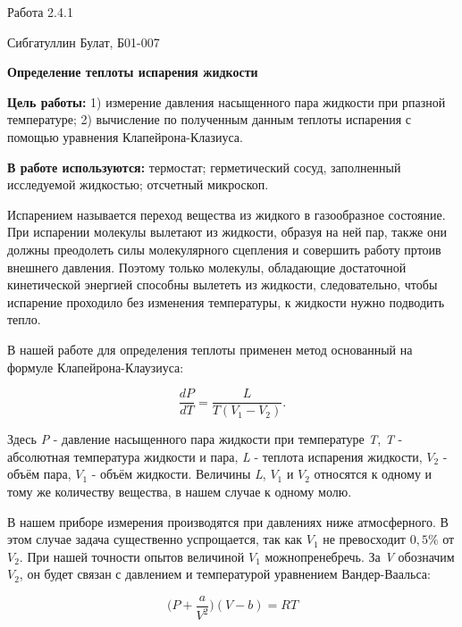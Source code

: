 \documentclass[12pt,a4paper]{article}
\begin{document}
\begin{center}
    \large
    Работа 2.4.1
    
    Сибгатуллин Булат, Б01-007
    
    \vspace{0.5cm}
    \textbf{Определение теплоты испарения жидкости}

\end{center}

\vspace{0.5cm}
\textbf{Цель работы:} 1) измерение давления насыщенного пара жидкости при рпазной температуре; 2) вычисление по полученным данным теплоты испарения с помощью уравнения Клапейрона-Клазиуса.

\vspace{0.5cm}
\textbf{В работе используются:} термостат; герметический сосуд, заполненный исследуемой жидкостью; отсчетный микроскоп.

\vspace{0.5cm}
Испарением называется переход вещества из жидкого в газообразное состояние. При испарении молекулы вылетают из жидкости, образуя на ней пар, также они должны преодолеть силы молекулярного сцепления и совершить работу пртоив внешнего давления. Поэтому  только молекулы, обладающие достаточной кинетической энергией способны вылететь из жидкости, следовательно, чтобы испарение проходило без изменения температуры, к жидкости нужно подводить тепло. 

В нашей работе для определения теплоты применен метод основанный на формуле Клапейрона-Клаузиуса:

\begin{equation}\label{Klapeiron-Klausius}
\frac{dP}{dT} = \frac{L}{T (V_1 - V_2)}.
\end{equation}

Здесь \textit{P} - давление насыщенного пара жидкости при температуре \textit{T}, \textit{T} - абсолютная температура жидкости и пара, \textit{L} - теплота испарения жидкости, $V_2$ - объём пара, $V_1$ - объём жидкости. Величины \textit{L}, $V_1$ и $V_2$ относятся к одному и тому же количеству вещества, в нашем случае к одному молю.

В нашем приборе измерения производятся при давлениях ниже атмосферного. В этом случае задача существенно успрощается, так как $V_1$ не превосходит $0,5\%$ от $V_2$. При нашей точности опытов величиной $V_1$ можнопренебречь. За \textit{V} обозначим $V_2$, он будет связан с давлением и температурой уравнением Вандер-Ваальса:

\begin{equation}\label{Vander-Vaals}
\Big(P + \frac{a}{V^2}\Big)(V - b) = RT
\end{equation}
\end{document}
